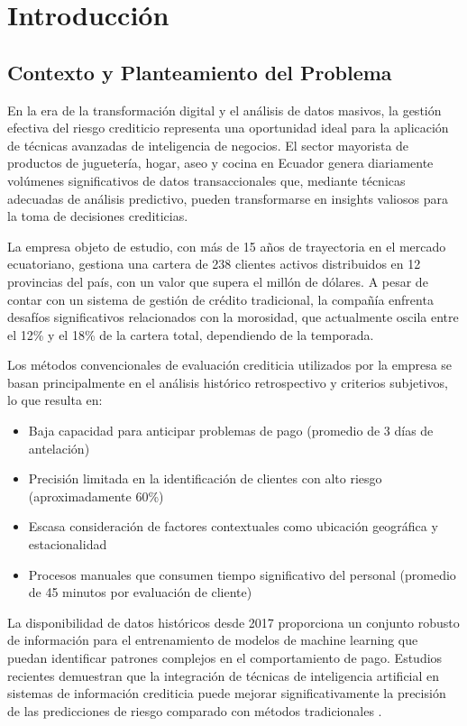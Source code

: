 \chapter{Introducción}

\section{Contexto y Planteamiento del Problema}

En la era de la transformación digital y el análisis de datos masivos, la gestión efectiva del riesgo crediticio representa una oportunidad ideal para la aplicación de técnicas avanzadas de inteligencia de negocios. El sector mayorista de productos de juguetería, hogar, aseo y cocina en Ecuador genera diariamente volúmenes significativos de datos transaccionales que, mediante técnicas adecuadas de análisis predictivo, pueden transformarse en insights valiosos para la toma de decisiones crediticias.

La empresa objeto de estudio, con más de 15 años de trayectoria en el mercado ecuatoriano, gestiona una cartera de 238 clientes activos distribuidos en 12 provincias del país, con un valor que supera el millón de dólares. A pesar de contar con un sistema de gestión de crédito tradicional, la compañía enfrenta desafíos significativos relacionados con la morosidad, que actualmente oscila entre el 12\% y el 18\% de la cartera total, dependiendo de la temporada.

Los métodos convencionales de evaluación crediticia utilizados por la empresa se basan principalmente en el análisis histórico retrospectivo y criterios subjetivos, lo que resulta en:

\begin{itemize}
    \item Baja capacidad para anticipar problemas de pago (promedio de 3 días de antelación)
    \item Precisión limitada en la identificación de clientes con alto riesgo (aproximadamente 60\%)
    \item Escasa consideración de factores contextuales como ubicación geográfica y estacionalidad
    \item Procesos manuales que consumen tiempo significativo del personal (promedio de 45 minutos por evaluación de cliente)
\end{itemize}

La disponibilidad de datos históricos desde 2017 proporciona un conjunto robusto de información para el entrenamiento de modelos de machine learning que puedan identificar patrones complejos en el comportamiento de pago. Estudios recientes demuestran que la integración de técnicas de inteligencia artificial en sistemas de información crediticia puede mejorar significativamente la precisión de las predicciones de riesgo comparado con métodos tradicionales \citep{kim2022credit, lessmann2015benchmarking}.

